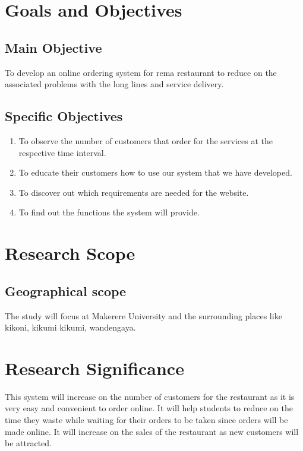 \documentclass {article}
\begin{document}
\section{ Goals and Objectives}
\subsection{ Main Objective}
To develop an online ordering system for rema restaurant to reduce on the associated problems with the long lines and service delivery.
	
\subsection {Specific Objectives}

\begin {enumerate}
\item	To observe  the number of customers that order for the services at the respective time interval.
\item	To educate their customers how to use our system that we have developed.
\item	To discover out which requirements are needed for the website.
\item	To find out the functions the system will provide.
\end {enumerate}

\section{Research Scope} 
\subsection	{Geographical scope}
The study will focus at Makerere University and the surrounding places like kikoni, kikumi kikumi, wandengaya.

\section{Research Significance}
This system will increase on the number of customers for the restaurant as it is very easy and convenient to order online.  
It will help students to reduce on the time they waste while waiting for their orders to be taken since orders will be made online.
It will increase on the sales of the restaurant as new customers will be attracted.
\end{document}
